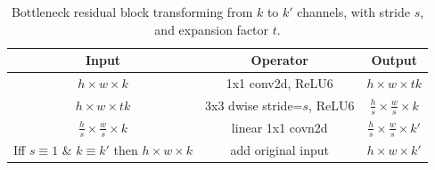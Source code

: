 \documentclass[12pt]{article}
\numberwithin{equation}{section}
\numberwithin{figure}{section}
\begin{document}
\begin{table}[H]
	\centering
	\begin{tabular}{c|c|c}
	\hline
	\textbf{Input}                            & \textbf{Operator}           & \textbf{Output}                            \\ \hline \hline
	$h \times w \times k$                     & 1x1 conv2d, ReLU6           & $h \times w \times tk$                     \\
	$h \times w \times tk$                    & 3x3 dwise stride=$s$, ReLU6 & $\frac{h}{s} \times \frac{w}{s} \times k$  \\
	$\frac{h}{s} \times \frac{w}{s} \times k$ & linear 1x1 covn2d           & $\frac{h}{s} \times \frac{w}{s} \times k'$ \\ \hline
	Iff $s \equiv 1$ \& $k \equiv k'$ then $h \times w \times k$ & add original input           & $h \times w \times k'$ \\ \hline
	\end{tabular}
	\caption{Bottleneck residual block transforming from $k$ to $k'$ channels, with stride $s$, and expansion factor $t$.
	}
	\label{tab:bottleneck}
	\end{table}
\end{document}
